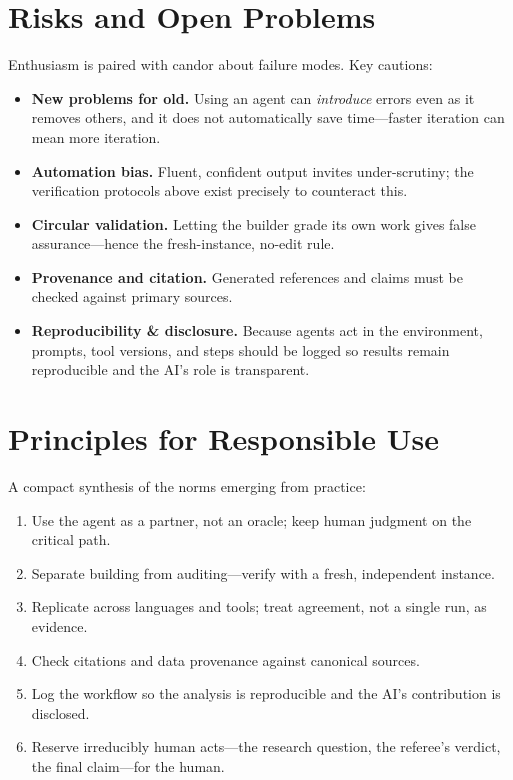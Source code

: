 \documentclass[11pt]{article}
\begin{document}
\section{Risks and Open Problems}
Enthusiasm is paired with candor about failure modes. Key cautions:
\begin{itemize}
  \item \textbf{New problems for old.} Using an agent can \emph{introduce}
        errors even as it removes others, and it does not automatically save
        time---faster iteration can mean more iteration.
  \item \textbf{Automation bias.} Fluent, confident output invites
        under-scrutiny; the verification protocols above exist precisely to
        counteract this.
  \item \textbf{Circular validation.} Letting the builder grade its own work
        gives false assurance---hence the fresh-instance, no-edit rule.
  \item \textbf{Provenance and citation.} Generated references and claims must
        be checked against primary sources.
  \item \textbf{Reproducibility \& disclosure.} Because agents act in the
        environment, prompts, tool versions, and steps should be logged so
        results remain reproducible and the AI's role is transparent.
\end{itemize}

\section{Principles for Responsible Use}
A compact synthesis of the norms emerging from practice:
\begin{enumerate}[leftmargin=1.5em]
  \item Use the agent as a partner, not an oracle; keep human judgment on the
        critical path.
  \item Separate building from auditing---verify with a fresh, independent
        instance.
  \item Replicate across languages and tools; treat agreement, not a single
        run, as evidence.
  \item Check citations and data provenance against canonical sources.
  \item Log the workflow so the analysis is reproducible and the AI's
        contribution is disclosed.
  \item Reserve irreducibly human acts---the research question, the referee's
        verdict, the final claim---for the human.
\end{enumerate}
\end{document}
